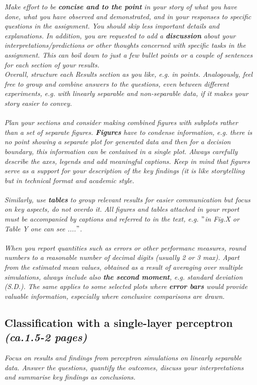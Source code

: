 \documentclass[a4paper]{article}
\begin{document}
\begin{framed}
\textit{Make effort to be \textbf{concise and to the point} in your story of what you have done, what you have observed and demonstrated, and in your responses to specific questions in the assignment. You should skip less important details and explanations. In addition, you are requested to add a \textbf{discussion} about your interpretations/predictions or other thoughts concerned with specific tasks in the assignment. This can boil down to just a few bullet points or a couple of sentences for each section of your results. \\ Overall, structure each Results section as you like, e.g. in points. Analogously, feel free to group and combine answers to the questions, even between different experiments, e.g. with linearly separable and non-separable data, if it makes your story easier to convey. \\
\\Plan your sections and consider making combined figures with subplots rather than a set of separate figures. \textbf{Figures} have to condense information, e.g. there is no point showing a separate plot for generated data and then for a decision boundary, this information can be contained in a single plot. Always carefully describe the axes, legends and add meaningful captions. Keep in mind that figures serve as a support for your description of the key findings (it is like storytelling but in technical format and academic style. \\
\\Similarly, use \textbf{tables} to group relevant results for easier communication but focus on key aspects, do not overdo it. All figures and tables attached in your report must be accompanied by captions and referred to in the text, e.g. $"$in Fig.X or Table Y one can see ....$"$. \\
\\When you report quantities such as errors or other performanc measures, round numbers to a reasonable number of decimal digits (usually 2 or 3 max). Apart from the estimated mean values, obtained as a result of averaging over multiple simulations, always include also \textbf{the second moment}, e.g. standard deviation (S.D.). The same applies to some selected plots where \textbf{error bars} would provide valuable information, especially where conclusive comparisons are drawn.} 
\end{framed}

\subsection{Classification with a single-layer perceptron \textit{(ca.1.5-2 pages)}}
\textit{Focus on results and findings from perceptron simulations on linearly separable data. Answer the questions, quantify the outcomes, discuss your interpretations and summarise key findings as conclusions.}
\end{document}
